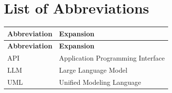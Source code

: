 \section*{List of Abbreviations}

{\small
\begin{longtable}{|>{\raggedright\arraybackslash}p{}|>{\raggedright\arraybackslash}p{}|}
\hline
\textbf{Abbreviation} & \textbf{Expansion} \\ \hline
\endfirsthead
\hline
\textbf{Abbreviation} & \textbf{Expansion} \\ \hline
\endhead
API & Application Programming Interface \\ \hline
LLM & Large Language Model \\ \hline
UML & Unified Modeling Language \\ \hline
\end{longtable}
}
